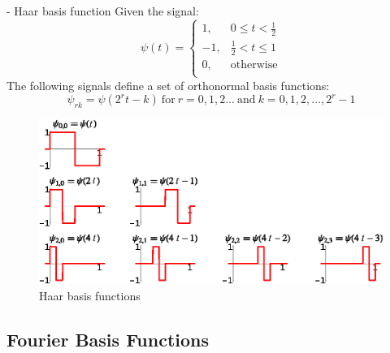\begin{ex}{- Haar basis function}
Given the signal:
\[ \psi(t) = 
\begin{cases}
    1,      &   0 \leq t < \frac{1}{2}\\
    -1,     &   \frac{1}{2} < t \leq 1\\
    0,      &   \text{otherwise}\\
\end{cases} \]
The following signals define a set of orthonormal basis functions:
\[ 
    \psi_{rk} = \psi(2^{r}t-k) \ \text{for} \ r=0,1,2... \ \text{and} \ k=0,1,2,...,2^{r}-1 
\]

 \begin{figure}[H]
     \centering
     \includegraphics[width = \textwidth]{images/Haar_func.eps}
     \caption{Haar basis functions} 
 \end{figure}
\end{ex}
\subsection{Fourier Basis Functions}

